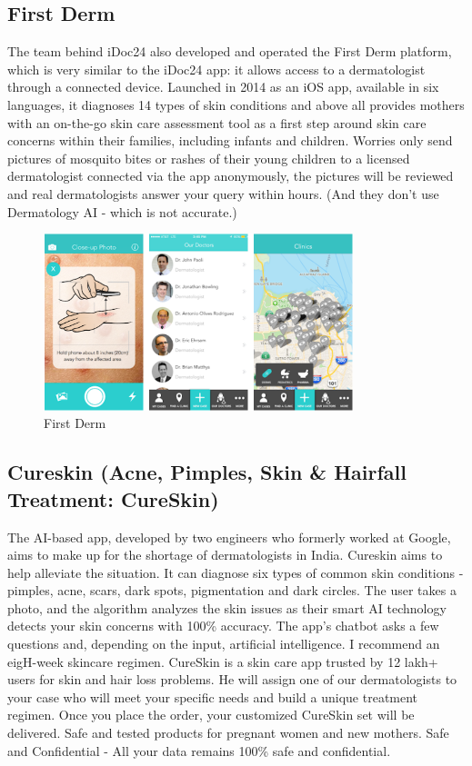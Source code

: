 \documentclass{article}
\begin{document}
\subsection{First Derm}The team behind iDoc24 also developed and operated the First Derm platform, which is very similar to the iDoc24 app: it allows access to a dermatologist through a connected device.
Launched in 2014 as an iOS app, available in six languages, it diagnoses 14 types of skin conditions and above all provides mothers with an on-the-go skin care assessment tool as a first step around skin care concerns within their families, including infants and children.
Worries only send pictures of mosquito bites or rashes of their young children to a licensed dermatologist connected via the app anonymously, the pictures will be reviewed and real dermatologists answer your query within hours. 
(And they don't use Dermatology AI - which is not accurate.)
\begin{figure}[H]
 \centering 
 \includegraphics[heigH= 8cm, width=9cm]{Figures/FirstDerm1.PNG}
 \caption{First Derm}
\end{figure}
\subsection{Cureskin (Acne, Pimples, Skin \& Hairfall Treatment: CureSkin)}The AI-based app, developed by two engineers who formerly worked at Google, aims to make up for the shortage of dermatologists in India.
Cureskin aims to help alleviate the situation. It can diagnose six types of common skin conditions - pimples, acne, scars, dark spots, pigmentation and dark circles. The user takes a photo, and the algorithm analyzes the skin issues as their smart AI technology detects your skin concerns with 100\% accuracy.
The app's chatbot asks a few questions and, depending on the input, artificial intelligence. I recommend an eigH-week skincare regimen.
CureSkin is a skin care app trusted by 12 lakh+ users for skin and hair loss problems.
He will assign one of our dermatologists to your case who will meet your specific needs and build a unique treatment regimen.
 Once you place the order, your customized CureSkin set will be delivered.
Safe and tested products for pregnant women and new mothers.
Safe and Confidential - All your data remains 100\% safe and confidential.
\end{document}
